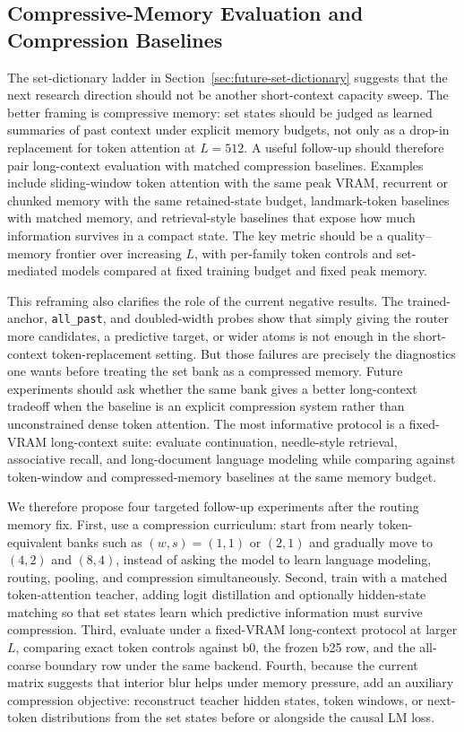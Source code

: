 \documentclass{article}
\theoremstyle{plain}
\theoremstyle{definition}
\theoremstyle{remark}
\begin{document}
\FloatBarrier

\subsection{Compressive-Memory Evaluation and Compression Baselines}
\label{sec:future-compressive-memory}

The set-dictionary ladder in Section~\ref{sec:future-set-dictionary} suggests
that the next research direction should not be another short-context capacity
sweep.  The better framing is compressive memory: set states should be judged
as learned summaries of past context under explicit memory budgets, not only as
a drop-in replacement for token attention at $L=512$.  A useful follow-up
should therefore pair long-context evaluation with matched compression
baselines.  Examples include sliding-window token attention with the same peak
VRAM, recurrent or chunked memory with the same retained-state budget,
landmark-token baselines with matched memory, and retrieval-style baselines
that expose how much information survives in a compact state.  The key metric
should be a quality--memory frontier over increasing $L$, with per-family
token controls and set-mediated models compared at fixed training budget and
fixed peak memory.

This reframing also clarifies the role of the current negative results.  The
trained-anchor, \texttt{all\_past}, and doubled-width probes show that simply
giving the router more candidates, a predictive target, or wider atoms is not
enough in the short-context token-replacement setting.  But those failures are
precisely the diagnostics one wants before treating the set bank as a
compressed memory.  Future experiments should ask whether the same bank gives a
better long-context tradeoff when the baseline is an explicit compression
system rather than unconstrained dense token attention.  The most informative
protocol is a fixed-VRAM long-context suite: evaluate continuation,
needle-style retrieval, associative recall, and long-document language
modeling while comparing against token-window and compressed-memory baselines
at the same memory budget.

We therefore propose four targeted follow-up experiments after the routing
memory fix.  First, use a compression curriculum: start from nearly
token-equivalent banks such as $(w,s)=(1,1)$ or $(2,1)$ and gradually move to
$(4,2)$ and $(8,4)$, instead of asking the model to learn language modeling,
routing, pooling, and compression simultaneously.  Second, train with a matched
token-attention teacher, adding logit distillation and optionally hidden-state
matching so that set states learn which predictive information must survive
compression.  Third, evaluate under a fixed-VRAM long-context protocol at larger
$L$, comparing exact token controls against b0, the frozen b25 row, and the
all-coarse boundary row under the same backend.  Fourth, because the current
matrix suggests that interior blur helps under memory pressure, add an
auxiliary compression objective: reconstruct teacher hidden states, token
windows, or next-token distributions from the set states before or alongside
the causal LM loss.
\end{document}

